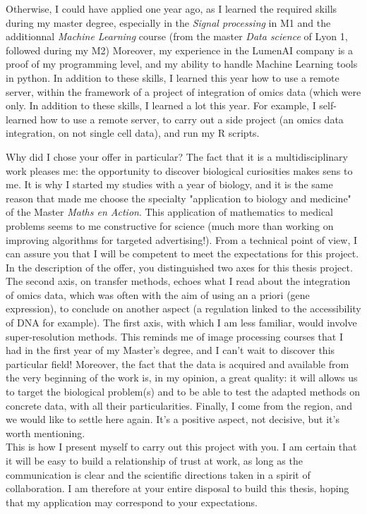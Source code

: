 \documentclass[a4paper,12pt]{article}
\begin{document}
Otherwise, I could have applied one year ago, as I learned the required skills during my master degree, especially in the \textit{Signal processing} in M1 and the additionnal \textit{Machine Learning} course (from the master \textit{Data science} of Lyon 1, followed during my M2)
Moreover, my experience in the LumenAI company is a proof of my programming level, and my ability to handle Machine Learning tools in python. In addition to these skills, I learned this year how to use a remote server, within the framework of a project of integration of omics data (which were only.
In addition to these skills, I learned a lot this year. For example, I self-learned how to use a remote server, to carry out a side project (an omics data integration, on not single cell data), and run my R scripts. 


Why did I chose your offer in particular? The fact that it is a multidisciplinary work pleases me: the opportunity to discover biological curiosities makes sens to me. It is why I started my studies with a year of biology, and it is the same reason that made me choose the specialty "application to biology and medicine" of the Master \textit{Maths en Action}. This application of mathematics to medical problems seems to me constructive for science (much more than working on improving algorithms for targeted advertising!). 
From a technical point of view, I can assure you that I will be competent to meet the expectations for this project. In the description of the offer, you distinguished two axes for this thesis project. The second axis, on transfer methods, echoes what I read about the integration of omics data, which was often with the aim of using an a priori (gene expression), to conclude on another aspect (a regulation linked to the accessibility of DNA for example). The first axis, with which I am less familiar, would involve super-resolution methods. This reminds me of image processing courses that I had in the first year of my Master's degree, and I can't wait to discover this particular field! %
%
Moreover, the fact that the data is acquired and available from the very beginning of the work is, in my opinion, a great quality: it will allows us to target the biological problem(s) and to be able to test the adapted methods on concrete data, with all their particularities. Finally, I come from the region, and we would like to settle here again. It's a positive aspect, not decisive, but it's worth mentioning. 
\\
%

This is how I present myself to carry out this project with you. I am certain that it will be easy to build a relationship of trust at work, as long as the communication is clear and the scientific directions taken in a spirit of collaboration. I am therefore at your entire disposal to build this thesis, hoping that my application may correspond to your expectations. 
%
\end{document}
